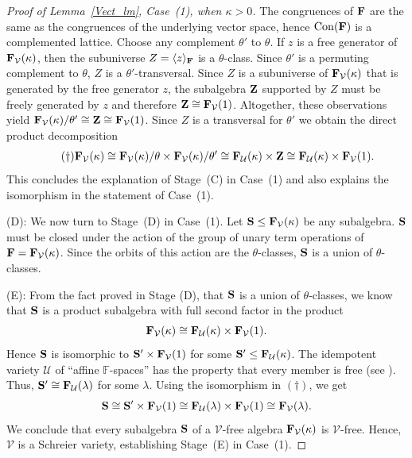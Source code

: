 \documentclass[12pt]{amsart}
\theoremstyle{definition}
\numberwithin{equation}{section}
\newcommand{\m}[1]{{\mathbf{\uppercase{#1}}}}
\DeclareMathOperator{\Con}{Con}
\begin{document}
\begin{proof}[Proof of Lemma~\ref{Vect_lm}, Case~(1), when $\kappa>0$]
The congruences of $\m f$ are the same as the congruences of the
underlying vector space, hence $\Con(\m f)$ is a complemented lattice.
Choose any complement $\theta'$ to $\theta$.
If $z$ is a free generator of $\m f_{\mathcal{V}}(\kappa)$,
then the subuniverse
$Z=\langle z\rangle_{\m f}$ is a $\theta$-class. Since
$\theta'$ is a permuting complement to $\theta$, $Z$ is
a $\theta'$-transversal. Since $Z$ is a subuniverse
of $\m f_{\mathcal{V}}(\kappa)$ that is generated by the free generator
$z$, the subalgebra $\m z$ supported by $Z$
must be freely generated by $z$
and therefore $\m z\cong \m f_{\mathcal{V}}(1)$.
Altogether, these observations yield
$\m f_{\mathcal{V}}(\kappa)/\theta'\cong \m z\cong \m f_{\mathcal{V}}(1)$.
Since $Z$ is a transversal for $\theta'$
we obtain the direct product decomposition
\[
\tag{$\dagger$} \label{ISO}
\m f_{\mathcal{V}}(\kappa)\cong 
\m f_{\mathcal{V}}(\kappa)/\theta\times 
\m f_{\mathcal{V}}(\kappa)/\theta'\cong 
\m f_{\mathcal{U}}(\kappa)\times
\m z
\cong 
\m f_{\mathcal{U}}(\kappa)\times
\m f_{\mathcal{V}}(1).
\]
This concludes the explanation of Stage~(C) in Case~(1)
and also explains the isomorphism in the statement of
Case~(1).

(D): We now turn to Stage~(D) in Case~(1).
Let $\m s\leq \m f_{\mathcal{V}}(\kappa)$ be any subalgebra.
$\m s$ must be closed under the action of the group
of unary term operations of $\m f = \m f_{\mathcal{V}}(\kappa)$.
Since the orbits of this action are the $\theta$-classes, 
$\m s$ is a union of $\theta$-classes.

(E): From the fact proved in Stage (D), that
$\m s$ is a union of $\theta$-classes, we know that
$\m s$ is a product subalgebra
with full second factor in the product
\[
\m f_{\mathcal{V}}(\kappa)\cong 
\m f_{\mathcal{U}}(\kappa)\times
\m f_{\mathcal{V}}(1).
\]
Hence
$\m s$ is isomorphic to $\m s'\times \m f_{\mathcal{V}}(1)$
for some $\m s'\leq \m f_{\mathcal{U}}(\kappa)$.
The idempotent variety $\mathcal{U}$
of ``affine $\mathbb{F}$-spaces''
has the property that every member is free
(see \cite{k-k-sz}).
Thus, $\m s'\cong \m f_{\mathcal{U}}(\lambda)$ for some
$\lambda$. Using the isomorphism in $(\dagger)$, we get
\[
\m s\cong \m s'\times \m f_{\mathcal{V}}(1)\cong 
\m f_{\mathcal{U}}(\lambda)\times
\m f_{\mathcal{V}}(1)\cong
\m f_{\mathcal{V}}(\lambda).
\]
We conclude that every subalgebra $\m s$
of a $\mathcal{V}$-free
algebra $\m f_{\mathcal{V}}(\kappa)$
is $\mathcal{V}$-free. Hence,
$\mathcal{V}$ is a Schreier variety, establishing Stage~(E)
in Case~(1).
\end{proof}
\end{document}
